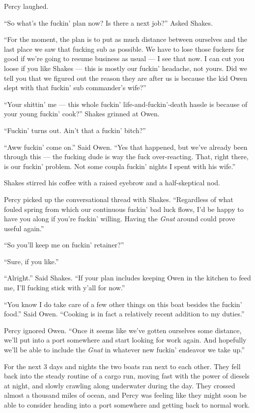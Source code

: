\documentclass[
]{scrbook}
\begin{document}
Percy laughed.

``So what's the fuckin' plan now? Is there a next job?'' Asked Shakes.

``For the moment, the plan is to put as much distance between ourselves
and the last place we saw that fucking sub as possible. We have to lose
those fuckers for good if we're going to resume business as usual --- I
see that now. I can cut you loose if you like Shakes --- this is mostly
our fuckin' headache, not yours. Did we tell you that we figured out the
reason they are after us is because the kid Owen slept with that fuckin'
sub commander's wife?''

``Your shittin' me --- this whole fuckin' life-and-fuckin'-death hassle
is because of your young fuckin' cook?'' Shakes grinned at Owen.

``Fuckin' turns out. Ain't that a fuckin' bitch?''

``Aww fuckin' come on.'' Said Owen. ``Yes that happened, but we've
already been through this --- the fucking dude is way the fuck
over-reacting. That, right there, is our fuckin' problem. Not some
coupla fuckin' nights I spent with his wife.''

Shakes stirred his coffee with a raised eyebrow and a half-skeptical
nod.

Percy picked up the conversational thread with Shakes. ``Regardless of
what fouled spring from which our continuous fuckin' bad luck flows, I'd
be happy to have you along if you're fuckin' willing. Having the
\emph{Gnat} around could prove useful again.''

``So you'll keep me on fuckin' retainer?''

``Sure, if you like.''

``Alright.'' Said Shakes. ``If your plan includes keeping Owen in the
kitchen to feed me, I'll fucking stick with y'all for now.''

``You know I do take care of a few other things on this boat besides the
fuckin' food.'' Said Owen. ``Cooking is in fact a relatively recent
addition to my duties.''

Percy ignored Owen. ``Once it seems like we've gotten ourselves some
distance, we'll put into a port somewhere and start looking for work
again. And hopefully we'll be able to include the \emph{Gnat} in
whatever new fuckin' endeavor we take up.''

For the next 3 days and nights the two boats ran next to each other.
They fell back into the steady routine of a cargo run, moving fast with
the power of diesels at night, and slowly crawling along underwater
during the day. They crossed almost a thousand miles of ocean, and Percy
was feeling like they might soon be able to consider heading into a port
somewhere and getting back to normal work.
\end{document}
